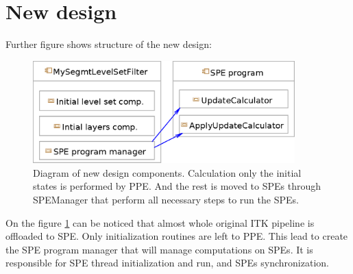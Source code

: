 \section{New design}

Further figure shows structure of the new design:

\begin{figure}
    \centering
    \includegraphics[width=0.9\textwidth]{data/newDesign}
    \caption[Diagram of new design components]
{
Diagram of new design components. Calculation only the initial states is performed by PPE.
And the rest is moved to SPEs through SPEManager that perform all necessary steps to run the SPEs.
}
    \label{fg:newDesign}
\end{figure}

On the figure \ref{fg:newDesign} can be noticed that almost whole original ITK pipeline is offloaded to SPE.
Only initialization routines are left to PPE. This lead to create the SPE program manager that will manage computations on SPEs.
It is responsible for SPE thread initialization and run, and SPEs synchronization.


